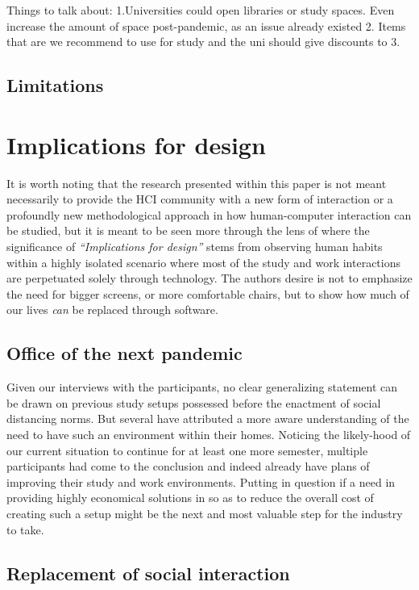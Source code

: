 \documentclass{sigchi}
\begin{document}
Things to talk about: 
1.Universities could open libraries or study spaces. Even increase the amount of space post-pandemic, as an issue already existed
2. Items that are we recommend to use for study and the uni should give discounts to
3. 

\subsection{Limitations}

\section{Implications for design}

It is worth noting that the research presented within this paper is not meant necessarily to provide the HCI community with a new form of interaction or a profoundly new methodological approach in how human-computer interaction can be studied, but it is meant to be seen more through the lens of \cite{dourish_implications_2006} where the significance of \emph{``Implications for design''} stems from observing human habits within a highly isolated scenario where most of the study and work interactions are perpetuated solely through technology. The authors desire is not to emphasize the need for bigger screens, or more comfortable chairs, but to show how much of our lives \emph{can} be replaced through software.

\subsection{Office of the next pandemic}

Given our interviews with the participants, no clear generalizing statement can be drawn on previous study setups possessed before the enactment of social distancing norms. But several have attributed a more aware understanding of the need to have such an environment within their homes. 
Noticing the likely-hood of our current situation to continue for at least one more semester, multiple participants had come to the conclusion and indeed already have plans of improving their study and work environments. Putting in question if a need in providing highly economical solutions in so as to reduce the overall cost of creating such a setup might be the next and most valuable step for the industry to take.

\subsection{Replacement of social interaction}
\end{document}
